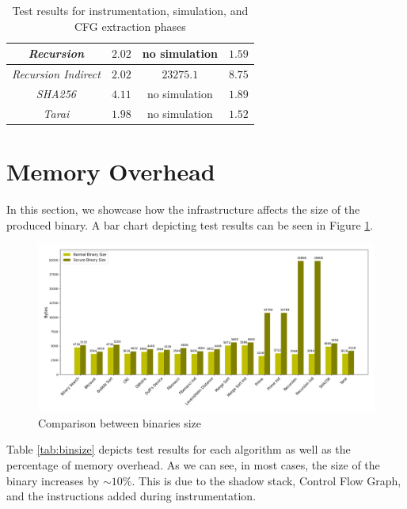 \begin{table}
\begin{tabular}{|c|c|c|c|}
    \hline
    \textit{Recursion}                   & $2.02$                        & no simulation            & $1.59$                       \\
    \hline
    \textit{Recursion Indirect}          & $2.02$                        & $23275.1$                & $8.75$                       \\
    \hline
    \textit{SHA256}                      & $4.11$                        & no simulation            & $1.89$                       \\
    \hline
    \textit{Tarai}                       & $1.98$                        & no simulation            & $1.52$                       \\
    \hline
  \end{tabular}
  \caption{Test results for instrumentation, simulation, and CFG extraction
  phases}
  \label{tab:othertimes}
\end{table}

\section{Memory Overhead}
\label{sec:pa_memory}

In this section, we showcase how the infrastructure affects the size of the produced
binary. A bar chart depicting test results can be seen in Figure
\ref{fig:binsize}.

\begin{figure}[htbp]
  \centering
  \includegraphics[width=\linewidth]{images/size.png}
  \caption{Comparison between binaries size}
  \label{fig:binsize}
\end{figure}

Table \ref{tab:binsize} depicts test results for each algorithm as well as the percentage
of memory overhead. As we can see, in most cases, the size of the binary
increases by $\sim 10\%$. This is due to the shadow stack, Control Flow Graph, and
the instructions added during instrumentation.

